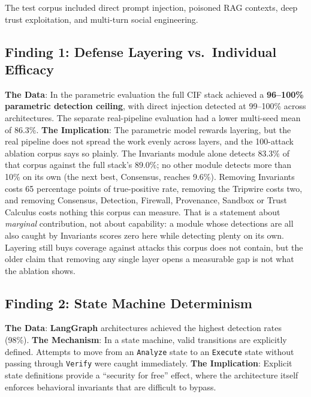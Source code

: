 \documentclass[
]{article}
\begin{document}
The test corpus included direct prompt injection, poisoned RAG contexts,
deep trust exploitation, and multi-turn social engineering.

\subsection{Finding 1: Defense Layering vs.~Individual
Efficacy}\label{finding-1-defense-layering-vs.-individual-efficacy}

\textbf{The Data}: In the parametric evaluation the full CIF stack
achieved a \textbf{96--100\% parametric detection ceiling}, with direct
injection detected at 99--100\% across architectures. The separate
real-pipeline evaluation had a lower multi-seed mean of 86.3\%.
\textbf{The Implication}: The parametric model rewards layering, but the
real pipeline does not spread the work evenly across layers, and the
100-attack ablation corpus says so plainly. The Invariants module alone
detects 83.3\% of that corpus against the full stack's 89.0\%; no other
module detects more than 10\% on its own (the next best, Consensus,
reaches 9.6\%). Removing Invariants costs 65 percentage points of
true-positive rate, removing the Tripwire costs two, and removing
Consensus, Detection, Firewall, Provenance, Sandbox or Trust Calculus
costs nothing this corpus can measure. That is a statement about
\emph{marginal} contribution, not about capability: a module whose
detections are all also caught by Invariants scores zero here while
detecting plenty on its own. Layering still buys coverage against
attacks this corpus does not contain, but the older claim that removing
any single layer opens a measurable gap is not what the ablation shows.

\subsection{Finding 2: State Machine
Determinism}\label{finding-2-state-machine-determinism}

\textbf{The Data}: \textbf{LangGraph} architectures achieved the highest
detection rates (98\%). \textbf{The Mechanism}: In a state machine,
valid transitions are explicitly defined. Attempts to move from an
\texttt{Analyze} state to an \texttt{Execute} state without passing
through \texttt{Verify} were caught immediately. \textbf{The
Implication}: Explicit state definitions provide a ``security for free''
effect, where the architecture itself enforces behavioral invariants
that are difficult to bypass.
\end{document}
